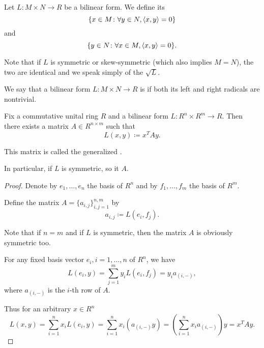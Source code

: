 \begin{definition}\label{def:bilinear_form_radicals}\cite[250]{Knapp2016BAlg}
  Let \( L: M \times N \to R \) be a bilinear form. We define its 
  \begin{equation*}
    \{ x \in M \colon \forall y \in N, \left\langle x, y \right\rangle = 0 \}
  \end{equation*}
  and 
  \begin{equation*}
    \{ y \in N \colon \forall x \in M, \left\langle x, y \right\rangle = 0 \}.
  \end{equation*}

  Note that if \( L \) is symmetric or skew-symmetric (which also implies \( M = N \)), the two are identical and we speak simply of the  \( \sqrt L \).
\end{definition}

\begin{definition}\label{def:nondegenerate_bilinear_form}\cite[249]{Knapp2016BAlg}
  We say that a bilinear form \( L: M \times N \to R \) is  if both its left and right radicals are nontrivial.
\end{definition}

\begin{theorem}\label{thm:bilinear_form_matrix_presentation}
  Fix a commutative unital ring \( R \) and a bilinear form \( L: R^n \times R^m \to R \). Then there exists a matrix \( A \in R^{n \times m} \) such that
  \begin{equation*}
    L(x, y) \coloneqq x^T A y.
  \end{equation*}

  This matrix is called the generalized .

  In particular, if \( L \) is symmetric, so it \( A \).
\end{theorem}
\begin{proof}
  Denote by \( e_1, \ldots, e_n \) the basis of \( R^n \) and by \( f_1, \ldots, f_m \) the basis of \( R^m \).

  Define the matrix \( A = \{ a_{i,j} \}_{i,j=1}^{n,m} \) by
  \begin{equation*}
    a_{i,j} \coloneqq L(e_i, f_j).
  \end{equation*}

  Note that if \( n = m \) and if \( L \) is symmetric, then the matrix \( A \) is obviously symmetric too.

  For any fixed basis vector \( e_i, i = 1, \ldots, n \) of \( R^n \), we have
  \begin{equation*}
    L(e_i, y)
    =
    \sum_{j=1}^m y_i L(e_i, f_j)
    =
    y_i a_{(i,-)},
  \end{equation*}
  where \( a_{(i,-)} \) is the \( i \)-th row of \( A \).

  Thus for an arbitrary \( x \in R^n \)
  \begin{equation*}
    L(x, y)
    =
    \sum_{i=1}^n x_i L(e_i, y)
    =
    \sum_{i=1}^n x_i (a_{(i,-)} y)
    =
    \left( \sum_{i=1}^n x_i a_{(i,-)} \right) y
    =
    x^T A y.
  \end{equation*}
\end{proof}

